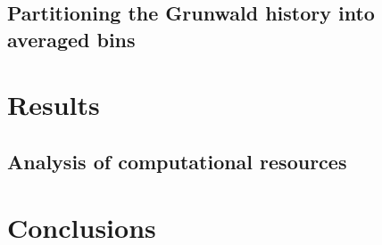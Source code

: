 \documentclass[12pt]{article}
\begin{document}
\subsection{Partitioning the Grunwald history into averaged bins}\label{algorithmDefn_avgShift}


\section{Results}\label{results}

\subsection{Analysis of computational resources}
%

\section{Conclusions}\label{conclusions}



\end{document}
